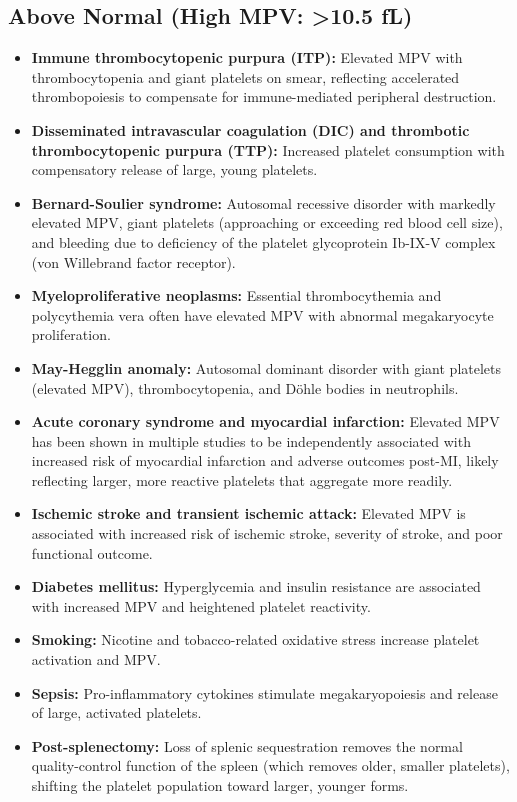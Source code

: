 \subsection*{Above Normal (High MPV: >10.5 fL)}
\begin{itemize}
  \item \textbf{Immune thrombocytopenic purpura (ITP):} Elevated MPV with thrombocytopenia and giant platelets on smear, reflecting accelerated thrombopoiesis to compensate for immune-mediated peripheral destruction.
  \item \textbf{Disseminated intravascular coagulation (DIC) and thrombotic thrombocytopenic purpura (TTP):} Increased platelet consumption with compensatory release of large, young platelets.
  \item \textbf{Bernard-Soulier syndrome:} Autosomal recessive disorder with markedly elevated MPV, giant platelets (approaching or exceeding red blood cell size), and bleeding due to deficiency of the platelet glycoprotein Ib-IX-V complex (von Willebrand factor receptor).
  \item \textbf{Myeloproliferative neoplasms:} Essential thrombocythemia and polycythemia vera often have elevated MPV with abnormal megakaryocyte proliferation.
  \item \textbf{May-Hegglin anomaly:} Autosomal dominant disorder with giant platelets (elevated MPV), thrombocytopenia, and D\"{o}hle bodies in neutrophils.
  \item \textbf{Acute coronary syndrome and myocardial infarction:} Elevated MPV has been shown in multiple studies to be independently associated with increased risk of myocardial infarction and adverse outcomes post-MI, likely reflecting larger, more reactive platelets that aggregate more readily.
  \item \textbf{Ischemic stroke and transient ischemic attack:} Elevated MPV is associated with increased risk of ischemic stroke, severity of stroke, and poor functional outcome.
  \item \textbf{Diabetes mellitus:} Hyperglycemia and insulin resistance are associated with increased MPV and heightened platelet reactivity.
  \item \textbf{Smoking:} Nicotine and tobacco-related oxidative stress increase platelet activation and MPV.
  \item \textbf{Sepsis:} Pro-inflammatory cytokines stimulate megakaryopoiesis and release of large, activated platelets.
  \item \textbf{Post-splenectomy:} Loss of splenic sequestration removes the normal quality-control function of the spleen (which removes older, smaller platelets), shifting the platelet population toward larger, younger forms.
\end{itemize}

